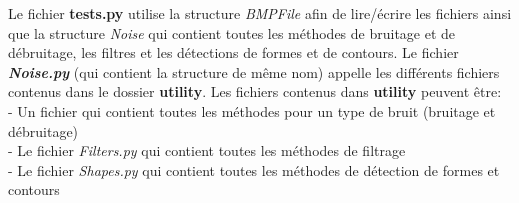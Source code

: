 \documentclass{article}
\begin{document}
			Le fichier \textbf{tests.py} utilise la structure \emph{BMPFile} afin de lire/écrire les fichiers ainsi que la structure \emph{Noise} qui contient toutes les méthodes de bruitage et de débruitage, les filtres et les détections de formes et de contours. Le fichier \emph{\textbf{Noise.py}} (qui contient la structure de même nom) appelle les différents fichiers contenus dans le dossier \textbf{utility}. Les fichiers contenus dans \textbf{utility} peuvent être:\\
			- Un fichier qui contient toutes les méthodes pour un type de bruit (bruitage et débruitage)\\
			- Le fichier \emph{Filters.py} qui contient toutes les méthodes de filtrage\\
			- Le fichier \emph{Shapes.py} qui contient toutes les méthodes de détection de formes et contours

\end{document}
